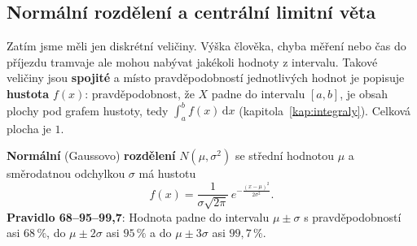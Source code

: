 \subsection{Normální rozdělení a centrální limitní věta}

Zatím jsme měli jen diskrétní veličiny. Výška člověka, chyba měření nebo čas do příjezdu tramvaje ale mohou nabývat jakékoli hodnoty z intervalu. Takové veličiny jsou \textbf{spojité} a místo pravděpodobností jednotlivých hodnot je popisuje \textbf{hustota} $f(x)$: pravděpodobnost, že $X$ padne do intervalu $[a, b]$, je obsah plochy pod grafem hustoty, tedy $\int_a^b f(x)\,\mathrm{d}x$ (kapitola~\ref{kap:integraly}). Celková plocha je $1$.

\begin{definitionbox}
  \textbf{Normální} (Gaussovo) \textbf{rozdělení} $N(\mu, \sigma^2)$ se střední hodnotou $\mu$ a směrodatnou odchylkou $\sigma$ má hustotu
  \begin{equation*}
    f(x) = \frac{1}{\sigma\sqrt{2\pi}}\,e^{-\frac{{(x - \mu)}^2}{2\sigma^2}}.
  \end{equation*}
  \textbf{Pravidlo 68--95--99,7}: Hodnota padne do intervalu $\mu\pm\sigma$ s pravděpodobností asi $68\,\%$, do $\mu\pm 2\sigma$ asi $95\,\%$ a do $\mu\pm 3\sigma$ asi $99{,}7\,\%$.
\end{definitionbox}

\begin{center}
\end{center}

